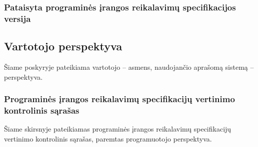 \documentclass{VUMIFPSkursinis}
\begin{document}
\subsubsection{Pataisyta programinės įrangos reikalavimų specifikacijos versija}

\subsection{Vartotojo perspektyva}

Šiame poskyryje pateikiama vartotojo -- asmens, naudojančio aprašomą sistemą -- perspektyva.

\subsubsection{Programinės įrangos reikalavimų specifikacijų vertinimo kontrolinis sąrašas}

Šiame skirsnyje pateikiamas programinės įrangos reikalavimų specifikacijų vertinimo kontrolinis sąrašas,
paremtas programuotojo perspektyva.
\end{document}
